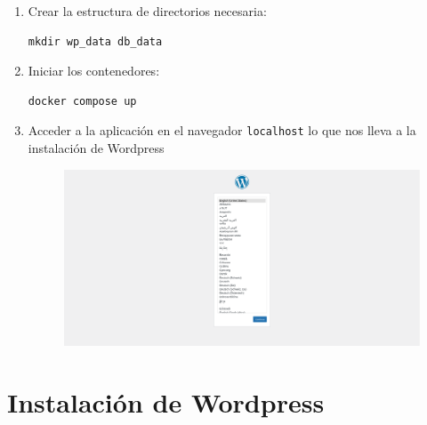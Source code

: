 \documentclass[a4paper]{article}
\begin{document}
\begin{enumerate}
    \item Crear la estructura de directorios necesaria:
    \begin{lstlisting}
mkdir wp_data db_data
    \end{lstlisting}

    \item Iniciar los contenedores:
    \begin{lstlisting}
docker compose up
    \end{lstlisting}

    \item Acceder a la aplicación en el navegador \texttt{localhost} lo que nos lleva a la instalación de Wordpress

    \begin{figure}[!h]
        \centering
        \includegraphics[width=0.8\linewidth]{images/wp_install1.png}
    \end{figure}
    
\end{enumerate}


\newpage

\section{Instalación de Wordpress}
\end{document}
